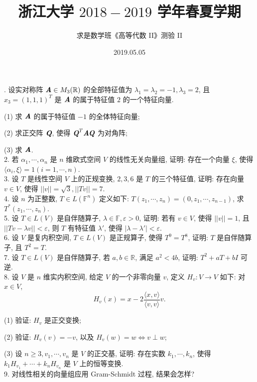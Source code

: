 \documentclass[UTF8]{ctexart}
\title{\LARGE \textbf{浙江大学 $2018-2019$ 学年春夏学期}}
\author{求是数学班《高等代数 II》测验 II}
\date{2019.05.05}
\begin{document}
. 设实对称阵 $\textit{\textbf{A}}\in M_3(\mathbb{R})$ 的全部特征值为 $\lambda_1=\lambda_2=-1,\lambda_3=2$, 且 $x_3=(1,1,1)^T$ 是 $\textit{\textbf{A}}$ 的属于特征值 $2$ 的一个特征向量.

(1) 求 $\textit{\textbf{A}}$ 的属于特征值 $-1$ 的全体特征向量;

(2) 求正交阵 $\textit{\textbf{Q}}$, 使得 $\textit{\textbf{Q}}^T\textit{\textbf{AQ}}$ 为对角阵;

(3) 求 $\textit{\textbf{A}}$.
\\

2. 若 $\alpha_1,\cdots,\alpha_n$ 是 $n$ 维欧式空间 $V$ 的线性无关向量组, 证明: 存在一个向量 $\xi$, 使得 $\langle\alpha_i,\xi\rangle=1(i=1,\cdots,n)$.
\\

3. 设 $T$ 是线性空间 $V$ 上的正规变换, $2,3,6$ 是 $T$ 的三个特征值, 证明: 存在向量 $v\in V$, 使得 $||v||=\sqrt{3},||Tv||=7$.
\\

4. 设 $n$ 为正整数, $T \in L(\mathbb{F}^n)$ 定义如下: $T(z_1,\cdots,z_n)=(0,z_1,\cdots,z_{n-1})$, 求 $T^{*}(z_1,\cdots,z_n)$.
\\

5. 设 $T\in L(V)$ 是自伴随算子, $\lambda\in\mathbb{F},\varepsilon >0$, 证明: 若有 $v\in V$, 使得 $||v||=1$, 且 $||Tv-\lambda v||<\varepsilon$, 则 $T$ 有特征值 $\lambda'$, 使得 $|\lambda-\lambda'|<\varepsilon$.
\\

6. 设 $V$ 是复内积空间, $T\in L(V)$ 是正规算子, 使得 $T^9=T^8$, 证明: $T$ 是自伴随算子, 且 $T^2=T$.
\\

7. 设 $T\in L(V)$ 是自伴随算子, 若 $a,b\in\mathbb{R}$, 满足 $a^2<4b$, 证明: $T^2+aT+bI$ 可逆.
\\

8. 设 $V$ 是 $n$ 维实内积空间, 给定 $V$ 的一个非零向量 $v$, 定义 $H_v:V\rightarrow V$ 如下: 对 $x\in V$,
\[
H_v(x)=x-2\frac{\langle x,v\rangle}{\langle v,v\rangle}v.
\]

(1) 验证: $H_v$ 是正交变换;

(2) 验证: $H_v(v)=-v$, 以及 $H_v(w)=w\Leftrightarrow v\perp w$;

(3) 设 $n\geq3,v_1,\cdots,v_n$ 是 $V$ 的正交基, 证明: 存在实数 $k_1,\cdots,k_n$, 使得 $k_1H_{v_1}+\cdots+k_nH_{v_n}$ 是 $V$ 上的恒等变换.
\\

9. 对线性相关的向量组应用 Gram-Schmidt 过程, 结果会怎样?
\end{document}
